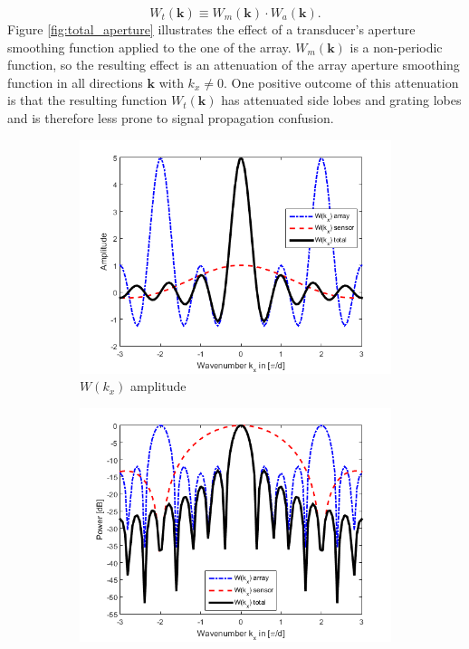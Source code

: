 \begin{equation}
    W_t(\boldsymbol{k}) \equiv W_m(\boldsymbol{k}) \cdot W_a(\boldsymbol{k}).
\end{equation}
\noindent
Figure \ref{fig:total_aperture} illustrates the effect of a transducer's aperture smoothing function applied to the one of the array. $W_m(\boldsymbol{k})$ is a non-periodic function, so the resulting effect is an attenuation of the array aperture smoothing function in all directions $\boldsymbol{k}$ with $k_x \neq 0$. One positive outcome of this attenuation is that the resulting function $W_t(\boldsymbol{k})$ has attenuated side lobes and grating lobes and is therefore less prone to signal propagation confusion.


\begin{figure}[ht]
    \centering
    \begin{subfigure}[b]{0.48\linewidth}
        \includegraphics[width=\linewidth]{./images/background/bg_grating1.png}
        \caption{$W(k_x)$ amplitude}
    \end{subfigure}
    \quad
    \begin{subfigure}[b]{0.48\linewidth}
        \includegraphics[width=\linewidth]{./images/background/bg_grating2.png}

\end{subfigure}
\end{figure}

